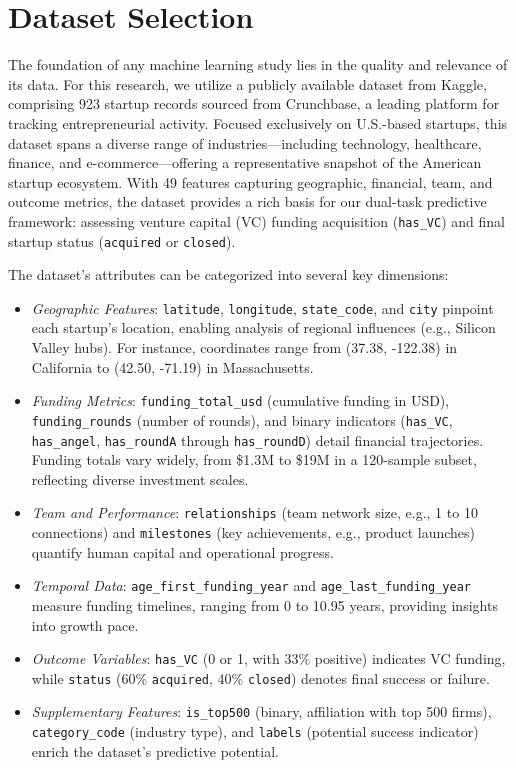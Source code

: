 \documentclass[conference]{IEEEtran}
\begin{document}
\section{Dataset Selection}
    The foundation of any machine learning study lies in the quality and relevance of its data. For this research, we utilize a publicly available dataset from Kaggle, comprising 923 startup records sourced from Crunchbase, a leading platform for tracking entrepreneurial activity. Focused exclusively on U.S.-based startups, this dataset spans a diverse range of industries—including technology, healthcare, finance, and e-commerce—offering a representative snapshot of the American startup ecosystem. With 49 features capturing geographic, financial, team, and outcome metrics, the dataset provides a rich basis for our dual-task predictive framework: assessing venture capital (VC) funding acquisition (\texttt{has\_VC}) and final startup status (\texttt{acquired} or \texttt{closed}).

    The dataset’s attributes can be categorized into several key dimensions:
    \begin{itemize}
        \item \textit{Geographic Features}: \texttt{latitude}, \texttt{longitude}, \texttt{state\_code}, and \texttt{city} pinpoint each startup’s location, enabling analysis of regional influences (e.g., Silicon Valley hubs). For instance, coordinates range from (37.38, -122.38) in California to (42.50, -71.19) in Massachusetts.
        \item \textit{Funding Metrics}: \texttt{funding\_total\_usd} (cumulative funding in USD), \texttt{funding\_rounds} (number of rounds), and binary indicators (\texttt{has\_VC}, \texttt{has\_angel}, \texttt{has\_roundA} through \texttt{has\_roundD}) detail financial trajectories. Funding totals vary widely, from \$1.3M to \$19M in a 120-sample subset, reflecting diverse investment scales.
        \item \textit{Team and Performance}: \texttt{relationships} (team network size, e.g., 1 to 10 connections) and \texttt{milestones} (key achievements, e.g., product launches) quantify human capital and operational progress.
        \item \textit{Temporal Data}: \texttt{age\_first\_funding\_year} and \texttt{age\_last\_funding\_year} measure funding timelines, ranging from 0 to 10.95 years, providing insights into growth pace.
        \item \textit{Outcome Variables}: \texttt{has\_VC} (0 or 1, with 33\% positive) indicates VC funding, while \texttt{status} (60\% \texttt{acquired}, 40\% \texttt{closed}) denotes final success or failure.
        \item \textit{Supplementary Features}: \texttt{is\_top500} (binary, affiliation with top 500 firms), \texttt{category\_code} (industry type), and \texttt{labels} (potential success indicator) enrich the dataset’s predictive potential.
    \end{itemize}
\end{document}
